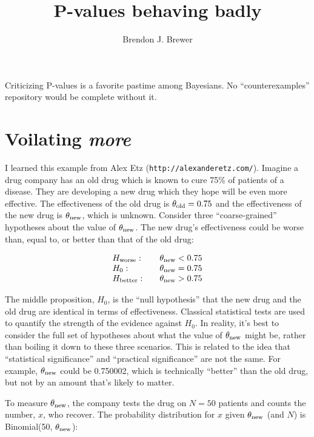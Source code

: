 \documentclass[a4paper, 12pt]{article}
\title{P-values behaving badly}
\author{Brendon J. Brewer}
\begin{document}
\maketitle

Criticizing P-values is a favorite pastime among Bayesians. No
``counterexamples'' repository would be complete without it.

\section{Voilating {\em more}}
I learned this example from Alex Etz ({\tt http://alexanderetz.com/}).
Imagine a drug company has an old drug which is known to cure
75\% of patients of a disease. They are developing a new drug
which they hope will be even more effective.
The effectiveness of the old drug is $\theta_{\rm old} = 0.75$ and the
effectiveness of the new drug is $\theta_{\rm new}$, which is unknown.
Consider three ``coarse-grained''
hypotheses about the value of $\theta_{\rm new}$. The new drug's
effectiveness could be worse than, equal to, or better than that of the old
drug:

\begin{equation}
\begin{array}{lcl}
H_{\rm worse}:  &  &\theta_{\rm new} < 0.75\\
H_0:            &  &\theta_{\rm new} = 0.75\\
H_{\rm better}: &  &\theta_{\rm new} > 0.75
\end{array}
\end{equation}

The middle proposition, $H_0$,
is the ``null hypothesis'' that the new drug and the
old drug are identical in terms of effectiveness. Classical statistical tests
are used to quantify the strength of the evidence against $H_0$. In reality,
it's best to consider the full set of hypotheses about what the value of
$\theta_{\rm new}$ might be, rather than boiling it down to these three
scenarios. This is related to the idea
that ``statistical significance'' and ``practical significance'' are not the
same. For example, $\theta_{\rm new}$ could be 0.750002, which is
technically ``better'' than the old drug, but not by an amount that's likely
to matter.

To measure $\theta_{\rm new}$, the company tests the drug on $N=50$ patients
and counts the number, $x$, who recover. The probability distribution for
$x$ given $\theta_{\rm new}$ (and $N$) is Binomial(50, $\theta_{\rm new}$):
\end{document}
